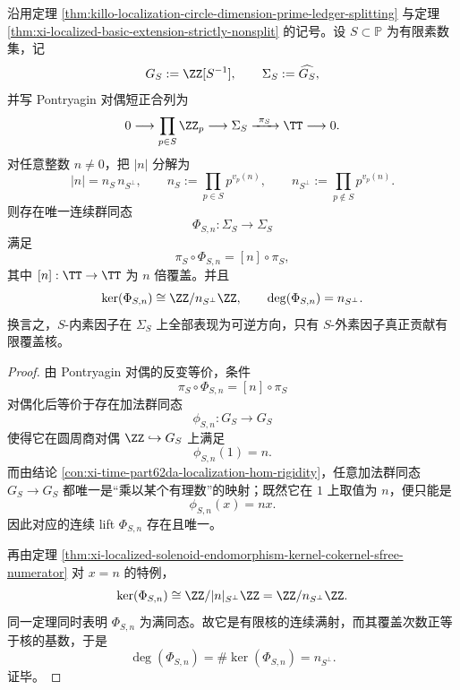 \begin{theorem}\label{thm:xi-time-part62db-localized-solenoid-circle-quotient-lifts}
沿用定理 \ref{thm:killo-localization-circle-dimension-prime-ledger-splitting} 与定理 \ref{thm:xi-localized-basic-extension-strictly-nonsplit} 的记号。设 \(S\subset\mathbb P\) 为有限素数集，记
\[
G_S:=\ZZ[S^{-1}],
\qquad
\Sigma_S:=\widehat{G_S},
\]
并写 Pontryagin 对偶短正合列为
\[
0\longrightarrow \prod_{p\in S}\ZZ_p
\longrightarrow \Sigma_S
\xrightarrow{\ \pi_S\ }
\TT
\longrightarrow 0.
\]
对任意整数 \(n\neq 0\)，把 \(|n|\) 分解为
\[
|n|=n_S\,n_{S^\perp},
\qquad
n_S:=\prod_{p\in S}p^{v_p(n)},
\qquad
n_{S^\perp}:=\prod_{p\notin S}p^{v_p(n)}.
\]
则存在唯一连续群同态
\[
\Phi_{S,n}:\Sigma_S\to \Sigma_S
\]
满足
\[
\pi_S\circ \Phi_{S,n}=[n]\circ \pi_S,
\]
其中 \([n]:\TT\to\TT\) 为 \(n\) 倍覆盖。并且
\[
\ker(\Phi_{S,n})\cong \ZZ/n_{S^\perp}\ZZ,
\qquad
\deg(\Phi_{S,n})=n_{S^\perp}.
\]
换言之，\(S\)-内素因子在 \(\Sigma_S\) 上全部表现为可逆方向，只有 \(S\)-外素因子真正贡献有限覆盖核。
\end{theorem}
\begin{proof}
由 Pontryagin 对偶的反变等价，条件
\[
\pi_S\circ \Phi_{S,n}=[n]\circ \pi_S
\]
对偶化后等价于存在加法群同态
\[
\phi_{S,n}:G_S\to G_S
\]
使得它在圆周商对偶 \(\ZZ\hookrightarrow G_S\) 上满足
\[
\phi_{S,n}(1)=n.
\]
而由结论 \ref{con:xi-time-part62da-localization-hom-rigidity}，任意加法群同态 \(G_S\to G_S\) 都唯一是“乘以某个有理数”的映射；既然它在 \(1\) 上取值为 \(n\)，便只能是
\[
\phi_{S,n}(x)=nx.
\]
因此对应的连续 lift \(\Phi_{S,n}\) 存在且唯一。

再由定理 \ref{thm:xi-localized-solenoid-endomorphism-kernel-cokernel-sfree-numerator} 对 \(x=n\) 的特例，
\[
\ker(\Phi_{S,n})\cong \ZZ/|n|_{S^\perp}\ZZ=\ZZ/n_{S^\perp}\ZZ.
\]
同一定理同时表明 \(\Phi_{S,n}\) 为满同态。故它是有限核的连续满射，而其覆盖次数正等于核的基数，于是
\[
\deg(\Phi_{S,n})=\#\ker(\Phi_{S,n})=n_{S^\perp}.
\]
证毕。
\end{proof}

